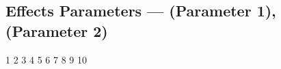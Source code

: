 \subsection[Effects Parameters]{Effects Parameters --- \UiKey{\SET} (Parameter 1), \UiKey{\SET} (Parameter 2)}










































1
2
3
4
5
6
7
8
9
10
